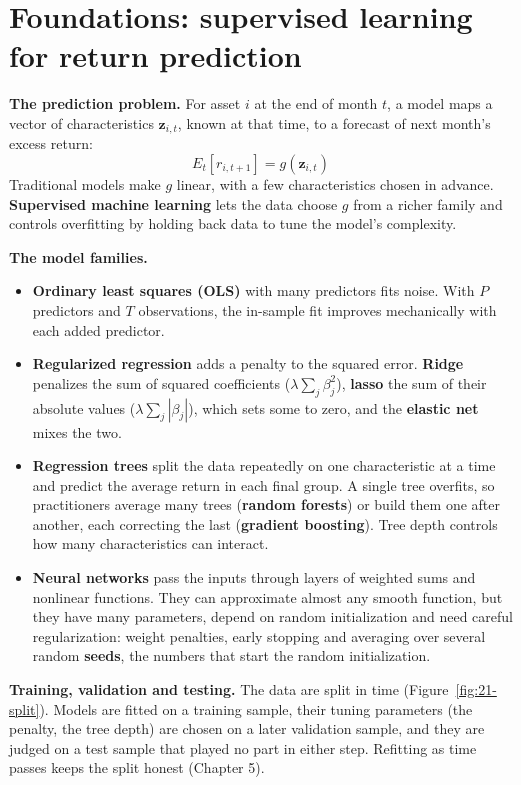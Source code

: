 \section{Foundations: supervised learning for return prediction}
\label{sec:21-foundations}

\textbf{The prediction problem.} For asset $i$ at the end of month $t$, a model maps a vector of characteristics $\mathbf{z}_{i,t}$, known at that time, to a forecast of next month's excess return:
\begin{equation}
  E_t[r_{i,t+1}] = g(\mathbf{z}_{i,t})
  \label{eq:21-g}
\end{equation}
Traditional models make $g$ linear, with a few characteristics chosen in advance. \textbf{Supervised machine learning} lets the data choose $g$ from a richer family and controls overfitting by holding back data to tune the model's complexity.

\textbf{The model families.}

\begin{itemize}
  \item \textbf{Ordinary least squares (OLS)} with many predictors fits noise. With $P$ predictors and $T$ observations, the in-sample fit improves mechanically with each added predictor.
  \item \textbf{Regularized regression} adds a penalty to the squared error. \textbf{Ridge} penalizes the sum of squared coefficients ($\lambda\sum_j\beta_j^2$), \textbf{lasso} the sum of their absolute values ($\lambda\sum_j|\beta_j|$), which sets some to zero, and the \textbf{elastic net} mixes the two.
  \item \textbf{Regression trees} split the data repeatedly on one characteristic at a time and predict the average return in each final group. A single tree overfits, so practitioners average many trees (\textbf{random forests}) or build them one after another, each correcting the last (\textbf{gradient boosting}). Tree depth controls how many characteristics can interact.
  \item \textbf{Neural networks} pass the inputs through layers of weighted sums and nonlinear functions. They can approximate almost any smooth function, but they have many parameters, depend on random initialization and need careful regularization: weight penalties, early stopping and averaging over several random \textbf{seeds}, the numbers that start the random initialization.
\end{itemize}

\textbf{Training, validation and testing.} The data are split in time (Figure~\ref{fig:21-split}). Models are fitted on a training sample, their tuning parameters (the penalty, the tree depth) are chosen on a later validation sample, and they are judged on a test sample that played no part in either step. Refitting as time passes keeps the split honest (Chapter 5).

